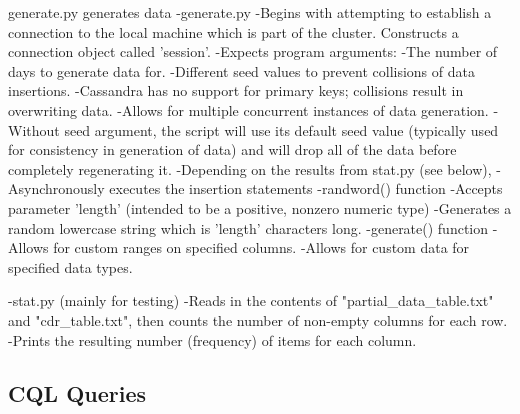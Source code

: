 \documentclass[letterpaper]{article}
\begin{document}
generate.py generates data 
-generate.py
-Begins with attempting to establish a connection to the local machine which is part
of the cluster. Constructs a connection object called 'session'.
-Expects program arguments: 
-The number of days to generate data for. 
-Different seed values to prevent collisions of data insertions.
-Cassandra has no support for primary keys; collisions result in overwriting data.
-Allows for multiple concurrent instances of data generation.
-Without seed argument, the script will use its default seed value (typically used
for consistency in generation of data) and will drop all of the data before completely
regenerating it.
-Depending on the results from stat.py (see below), 
-Asynchronously executes the insertion statements 
-randword() function
-Accepts parameter 'length' (intended to be a positive, nonzero numeric type)
-Generates a random lowercase string which is 'length' characters long.
-generate() function
-Allows for custom ranges on specified columns.
-Allows for custom data for specified data types.

-stat.py (mainly for testing)
-Reads in the contents of "partial\_data\_table.txt" and
"cdr\_table.txt", then counts the number of non-empty columns for
each row.
-Prints the resulting number (frequency) of items for each column.



\subsection{CQL Queries}
\end{document}
